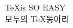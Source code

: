\documentclass{oblivoir}
\begin{document}
	\begin{center}
		{\Huge\TeX \hspace{10pt}is SO EASY} \\
		\vspace{10pt}
		{\large 모두의 \TeX\phantom{ }동아리}
	\end{center}
\end{document}
